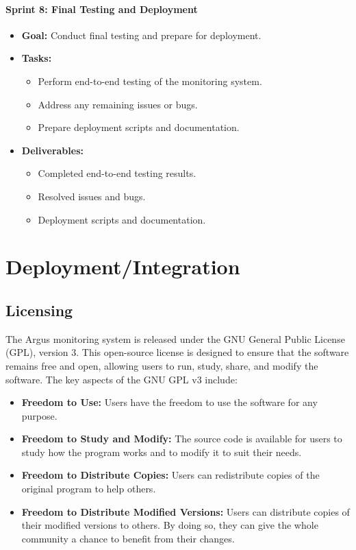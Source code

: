 \documentclass{article}
\begin{document}
    \paragraph{Sprint 8: Final Testing and Deployment}
    \begin{itemize}
        \item \textbf{Goal:} Conduct final testing and prepare for deployment.
        \item \textbf{Tasks:}
        \begin{itemize}
            \item Perform end-to-end testing of the monitoring system.
            \item Address any remaining issues or bugs.
            \item Prepare deployment scripts and documentation.
        \end{itemize}
        \item \textbf{Deliverables:}
        \begin{itemize}
            \item Completed end-to-end testing results.
            \item Resolved issues and bugs.
            \item Deployment scripts and documentation.
        \end{itemize}
    \end{itemize}

    \newpage


    \section{Deployment/Integration}\label{sec:deployment-integration}

    \subsection{Licensing}\label{subsec:licensing}

    The Argus monitoring system is released under the GNU General Public License (GPL), version 3.
    This open-source license is designed to ensure that the software remains free and open, allowing users to run, study, share, and modify the software.
    The key aspects of the GNU GPL v3 include:

    \begin{itemize}
        \item \textbf{Freedom to Use:} Users have the freedom to use the software for any purpose.
        \item \textbf{Freedom to Study and Modify:} The source code is available for users to study how the program works and to modify it to suit their needs.
        \item \textbf{Freedom to Distribute Copies:} Users can redistribute copies of the original program to help others.
        \item \textbf{Freedom to Distribute Modified Versions:} Users can distribute copies of their modified versions to others.
        By doing so, they can give the whole community a chance to benefit from their changes.
    \end{itemize}
\end{document}
